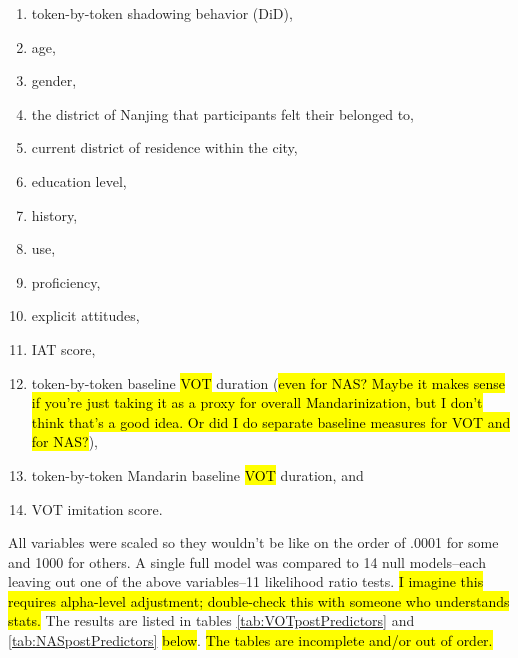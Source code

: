 \begin{enumerate}
    \item token-by-token shadowing behavior (DiD),
    \item age,
    \item gender,
    \item the district of Nanjing that participants felt their \ND{} belonged to,
    \item current district of residence within the city,
    \item education level,
    \item history,
    \item use,
    \item proficiency,
    \item explicit attitudes,
    \item IAT score,
    \item token-by-token \ND{} baseline \hl{VOT} duration (\hl{even for NAS? Maybe it makes sense if you're just taking it as a proxy for overall Mandarinization, but I don't think that's a good idea. Or did I do separate baseline measures for VOT and for NAS?}),
    \item token-by-token Mandarin baseline \hl{VOT} duration, and
    \item VOT imitation score.
\end{enumerate}
All variables were scaled so they wouldn't be like on the order of .0001 for some and 1000 for others. A single full model was compared to 14 null models--each leaving out one of the above variables--11 likelihood ratio tests. \hl{I imagine this requires alpha-level adjustment; double-check this with someone who understands stats.} The results are listed in tables \ref{tab:VOTpostPredictors} and \ref{tab:NASpostPredictors} \hl{below}. \hl{The tables are incomplete and/or out of order.}


